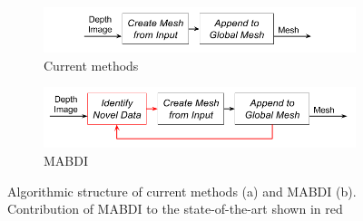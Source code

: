 \begin{figure}[h]%
\centering
\begin{subfigure}[t]{\textwidth}
  \includegraphics[width=.9\textwidth]{figures/diagram_general_pipeline_blackbox.png}
  \caption{Current methods}
  \label{fig:pipeline_cs}
\end{subfigure}
\begin{subfigure}[b]{\textwidth}
  \includegraphics[width=.9\textwidth]{figures/diagram_general_pipeline_mabdi.png}
  \caption{MABDI}
  \label{fig:pipeline_mabdi}
\end{subfigure}
\caption{Algorithmic structure of current methods (a) and MABDI
(b). Contribution of MABDI to the state-of-the-art shown in red}
\label{fig:pipeline}
\end{figure}
